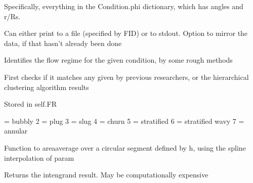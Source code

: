 \documentclass[letterpaper,10pt,english]{sphinxmanual}
\begin{document}
\begin{fulllineitems}
\begin{fulllineitems}
\sphinxAtStartPar
Specifically, everything in the Condition.phi dictionary, which has angles
and r/Rs.

\sphinxAtStartPar
Can either print to a file (specified by FID) or to stdout. Option to mirror the
data, if that hasn’t already been done

\end{fulllineitems}


\begin{fulllineitems}
\label{\detokenize{api/MARIGOLD.Condition:MARIGOLD.Condition.rough_FR_ID}}
\pysigstartsignatures
{}
\pysigstopsignatures
\sphinxAtStartPar
Identifies the flow regime for the given condition, by some rough methods

\sphinxAtStartPar
First checks if it matches any given by previous researchers, or the hierarchical
clustering algorithm results

\sphinxAtStartPar
Stored in self.FR

 = bubbly
2 = plug
3 = slug
4 = churn
5 = stratified
6 = stratified wavy
7 = annular

\end{fulllineitems}


\begin{fulllineitems}
\label{\detokenize{api/MARIGOLD.Condition:MARIGOLD.Condition.spline_circ_seg_area_avg}}
\pysigstartsignatures
{}
\pysigstopsignatures
\sphinxAtStartPar
Function to area\sphinxhyphen{}average over a circular segment defined by h, using the spline interpolation of param

\sphinxAtStartPar
Returns the intengrand result. May be computationally expensive

\end{fulllineitems}


\end{fulllineitems}
\end{document}
